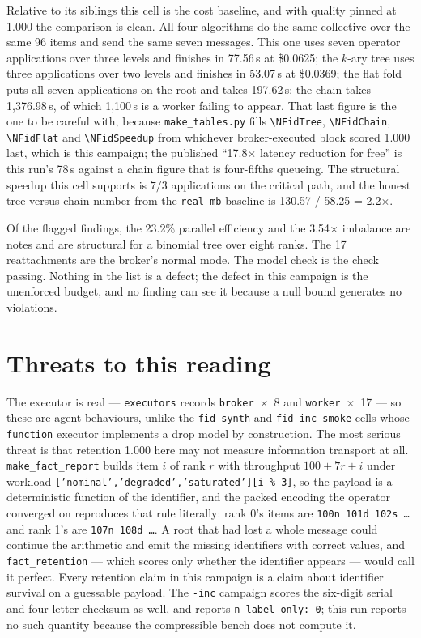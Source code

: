 \documentclass[11pt]{article}
\begin{document}
Relative to its siblings this cell is the cost baseline, and with quality pinned at 1.000
the comparison is clean. All four algorithms do the same collective over the same 96 items
and send the same seven messages. This one uses seven operator applications over three
levels and finishes in 77.56\,s at \$0.0625; the $k$-ary tree uses three applications over
two levels and finishes in 53.07\,s at \$0.0369; the flat fold puts all seven applications
on the root and takes 197.62\,s; the chain takes 1{,}376.98\,s, of which 1{,}100\,s is a
worker failing to appear. That last figure is the one to be careful with, because
\texttt{make\_tables.py} fills \texttt{\textbackslash NFidTree},
\texttt{\textbackslash NFidChain}, \texttt{\textbackslash NFidFlat} and
\texttt{\textbackslash NFidSpeedup} from whichever broker-executed block scored 1.000 last,
which is this campaign; the published ``17.8$\times$ latency reduction for free'' is this
run's 78\,s against a chain figure that is four-fifths queueing. The structural speedup
this cell supports is $7/3$ applications on the critical path, and the honest
tree-versus-chain number from the \texttt{real-mb} baseline is 130.57 / 58.25 = 2.2$\times$.

Of the flagged findings, the 23.2\% parallel efficiency and the 3.54$\times$ imbalance are
notes and are structural for a binomial tree over eight ranks. The 17 reattachments are the
broker's normal mode. The model check is the check passing. Nothing in the list is a
defect; the defect in this campaign is the unenforced budget, and no finding can see it
because a null bound generates no violations.

\section{Threats to this reading}

The executor is real --- \texttt{executors} records \texttt{broker}~$\times$~8 and
\texttt{worker}~$\times$~17 --- so these are agent behaviours, unlike the
\texttt{fid-synth} and \texttt{fid-inc-smoke} cells whose \texttt{function} executor
implements a drop model by construction. The most serious threat is that retention 1.000
here may not measure information transport at all. \texttt{make\_fact\_report} builds item
$i$ of rank $r$ with throughput $100 + 7r + i$ under workload
\texttt{['nominal','degraded','saturated'][i \% 3]}, so the payload is a deterministic
function of the identifier, and the packed encoding the operator converged on reproduces
that rule literally: rank 0's items are \texttt{100n 101d 102s \dots} and rank 1's are
\texttt{107n 108d \dots}. A root that had lost a whole message could continue the
arithmetic and emit the missing identifiers with correct values, and
\texttt{fact\_retention} --- which scores only whether the identifier appears --- would
call it perfect. Every retention claim in this campaign is a claim about identifier
survival on a guessable payload. The \texttt{-inc} campaign scores the six-digit serial and
four-letter checksum as well, and reports \texttt{n\_label\_only: 0}; this run reports no
such quantity because the compressible bench does not compute it.
\end{document}
